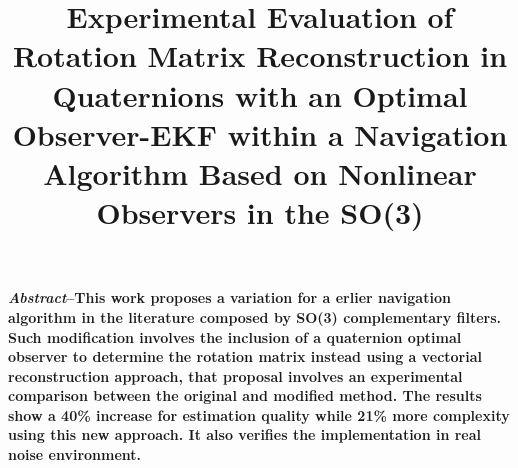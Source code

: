 \documentclass[conference]{IEEEtran}
\begin{document}
%
\title{Experimental Evaluation of Rotation Matrix Reconstruction in Quaternions with an Optimal Observer-EKF within a Navigation Algorithm Based on Nonlinear Observers in the SO(3)}
% 
\author{
}
\maketitle
\textbf{\small \emph{Abstract}--This work proposes a variation for a erlier navigation algorithm in the literature composed by SO(3) complementary filters. Such modification involves the inclusion of a quaternion optimal observer to determine  the rotation matrix instead using a vectorial reconstruction approach, that proposal involves an experimental comparison between the original and modified method. The results show a 40\% increase for estimation quality while 21\% more complexity using this new approach. It also verifies the implementation in real noise environment.\\[3mm]}
\end{document}
